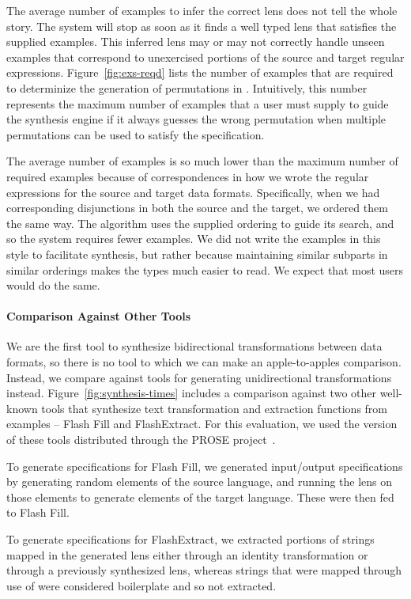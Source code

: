 \documentclass[acmsmall,screen]{acmart}
\begin{document}
The average number of examples to
infer the correct lens does not tell the whole story.  The system will
stop as soon as it finds a well typed lens that satisfies the supplied examples.
This inferred lens may or may not 
correctly handle unseen examples that correspond to
unexercised portions of the source and target regular expressions.
Figure~\ref{fig:exs-reqd} lists
the number of examples that are required to determinize the generation of
permutations in \RigidSynth{}.
Intuitively, this number represents the maximum number of
examples that a user must supply to guide the synthesis engine if it
always guesses the wrong permutation when multiple permutations can be used to
satisfy the specification. 

The average number of examples is so much lower than the maximum
number of required examples because of correspondences in how we wrote
the regular expressions for the source and target data formats. 
Specifically, when we had corresponding disjunctions in both the
source and the target, we ordered them the same way.  The algorithm
uses the supplied ordering to guide its search, and so the system
requires fewer examples.   We did not write the examples in this style
to facilitate synthesis, but rather because maintaining similar
subparts in similar orderings makes the types much easier to 
read. We expect that most users would do the same.

\paragraph*{Comparison Against Other Tools}
%
We are the first tool to synthesize bidirectional transformations between data
formats, so there is no tool to which we can make an apple-to-apples comparison.
Instead, we compare against tools for generating unidirectional
transformations instead. 
Figure~\ref{fig:synthesis-times} includes a comparison against two other
well-known tools that synthesize
text transformation and extraction functions from examples -- Flash Fill and FlashExtract.  For this
evaluation, we used the version of these tools distributed through the
PROSE project~\cite{prose}.

To generate specifications for Flash Fill, we generated input/output
specifications by generating random elements of the source language, and
running the lens on those elements to generate elements of the target language.
These were then fed to Flash Fill.

To generate specifications for FlashExtract, we extracted portions of strings
mapped in the generated lens either through an identity
transformation or through a previously synthesized lens, whereas strings that were
mapped through use of \ConstLens{} were considered boilerplate and so not
extracted.
\end{document}
